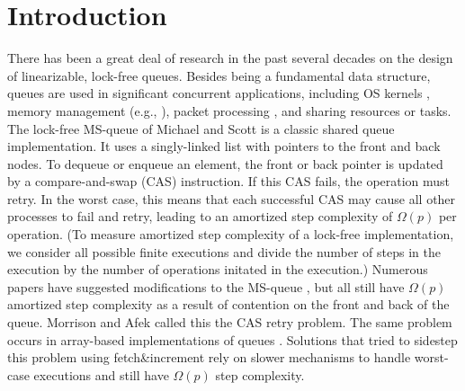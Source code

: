 
\section{Introduction}

There has been a great deal of research in the past several decades on the design of linearizable, lock-free queues.
Besides being a fundamental data structure, queues are used in
significant concurrent applications, including OS kernels \cite{MP91}, memory management (e.g., \cite{BBFRSW21} ),
packet processing \cite{DPDK},
and sharing resources or tasks.
The lock-free MS-queue of Michael and Scott \cite{MS98} is a classic shared queue implementation.
It uses a singly-linked list with pointers to the front and back nodes.
To dequeue or enqueue an element, the front or back pointer is updated by a 
compare-and-swap (CAS) instruction.
If this CAS fails, the operation must retry.
In the worst case, this means that each successful CAS may cause all other processes to
fail and retry, leading to an amortized step complexity of $\Omega(p)$ per operation.
(To measure amortized step complexity of a lock-free implementation, we consider all possible finite executions
and divide the number of steps in the execution by the number of operations initated in the execution.)
Numerous papers have suggested modifications to the MS-queue \cite{DBLP:conf/opodis/HoffmanSS07,DBLP:conf/podc/KoganH14,DBLP:conf/ppopp/KoganP11,DBLP:journals/dc/Ladan-MozesS08,MKLLP22,DBLP:conf/spaa/MoirNSS05,RC17}, but 
all still have $\Omega(p)$ amortized step complexity as a result of
contention on the front and back of the queue.
Morrison and Afek \cite{DBLP:conf/ppopp/MorrisonA13} called this the CAS retry problem.
The same problem occurs in array-based implementations of queues \cite{DBLP:conf/iceccs/ColvinG05,DBLP:conf/icdcn/Shafiei09,DBLP:conf/spaa/TsigasZ01,DBLP:conf/opodis/GidenstamST10}.
Solutions that tried to sidestep this problem using fetch\&increment \cite{DBLP:conf/ppopp/MorrisonA13,DBLP:conf/ppopp/YangM16,Nik19,10.1145/3490148.3538572}
rely on slower mechanisms to handle worst-case executions and still have $\Omega(p)$ step complexity.

